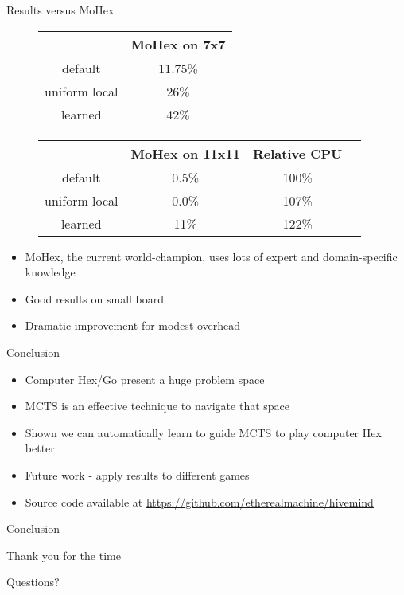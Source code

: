 \documentclass{beamer}
\begin{document}
\begin{frame}{Results versus MoHex}
\begin{figure}
	\begin{center}
		\begin{tabular}{c | c}
		& MoHex on 7x7 \\
		\hline
		default & 11.75\% \\
		uniform local & 26\% \\
		learned & 42\% \\
		\end{tabular}
	\end{center}
\end{figure}
\begin{figure}
	\begin{center}
		\begin{tabular}{c  | c c c}
		& MoHex on 11x11 & Relative CPU \\
		\hline
		default & 0.5\% & 100\% \\
		uniform local & 0.0\% & 107\% \\
		learned & 11\% & 122\% \\
		\end{tabular}
	\end{center}
\end{figure}
\begin{itemize}
	\item MoHex, the current world-champion, uses lots of expert and domain-specific knowledge
	\item Good results on small board
	\item Dramatic improvement for modest overhead
\end{itemize}
\end{frame}

\begin{frame}{Conclusion}
\begin{itemize}
	\item Computer Hex/Go present a huge problem space
	\item MCTS is an effective technique to navigate that space
	\item Shown we can automatically learn to guide MCTS to play computer Hex better
	\item Future work - apply results to different games
	\item Source code available at \url{https://github.com/etherealmachine/hivemind}
\end{itemize}
\end{frame}

\begin{frame}{Conclusion}
\centerline{Thank you for the time}
\centerline{Questions?}
\end{frame}
\end{document}
